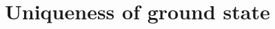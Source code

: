 \newcommand{\intrrr}{\int_{\R^3}}
\newcommand\todo[1]{{\green#1}}
\chapter{Uniqueness of ground state}






